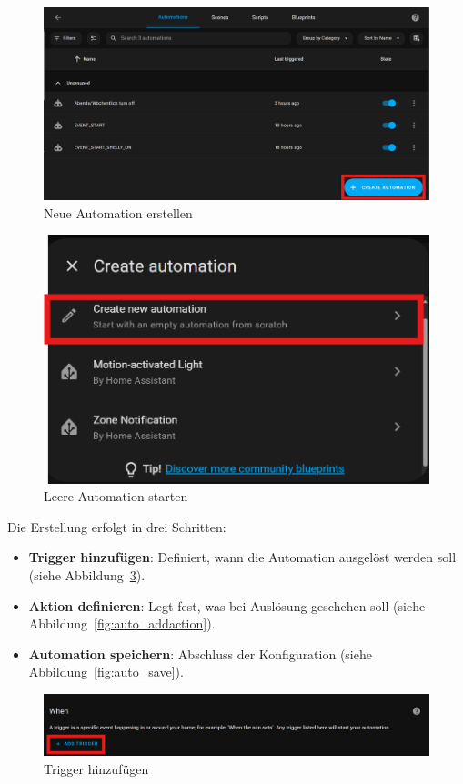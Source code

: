 \begin{figure}[H]
    \centering
    \includegraphics[width=0.7\linewidth]{images/auto_create1.png}
    \caption{Neue Automation erstellen}
    \label{fig:auto_create1}
\end{figure}

\begin{figure}[H]
    \centering
    \includegraphics[width=0.7\linewidth]{images/auto_create2.png}
    \caption{Leere Automation starten}
    \label{fig:auto_create2}
\end{figure}

Die Erstellung erfolgt in drei Schritten:
\begin{itemize}
    \item \textbf{Trigger hinzufügen}: Definiert, wann die Automation ausgelöst werden soll (siehe Abbildung~\ref{fig:auto_addtrig1}).\\
    \item \textbf{Aktion definieren}: Legt fest, was bei Auslösung geschehen soll (siehe Abbildung~\ref{fig:auto_addaction}).\\
    \item \textbf{Automation speichern}: Abschluss der Konfiguration (siehe Abbildung~\ref{fig:auto_save}).
\end{itemize}

\begin{figure}[H]
    \centering
    \includegraphics[width=0.7\linewidth]{images/auto_addtrig1.png}
    \caption{Trigger hinzufügen}
    \label{fig:auto_addtrig1}
\end{figure}

